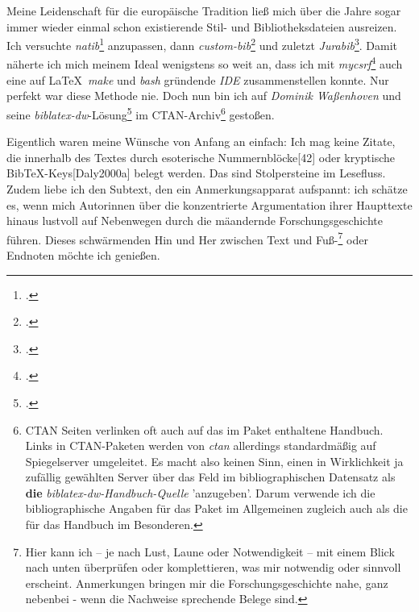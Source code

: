 Meine Leidenschaft für die europäische Tradition ließ mich über die Jahre sogar immer wieder einmal schon existierende Stil- und Bibliotheksdateien ausreizen. Ich versuchte \emph{natib}\footcite[vgl.][]{Daly2000a} anzupassen, dann \emph{custom-bib}\footcite[vgl.][]{Daly2007a} und zuletzt \emph{Jurabib}\footcite[vgl.][]{Berger2004a}. Damit näherte ich mich meinem Ideal wenigstens so weit an, dass ich mit  \emph{mycsrf}\footcite[vgl.][]{Reincke2021a} auch eine auf \LaTeX\, \emph{make} und \emph{bash} gründende \emph{IDE} zusammenstellen konnte. Nur perfekt war diese Methode nie. Doch nun bin ich auf \emph{Dominik Waßenhoven} und seine \emph{biblatex-dw}-Lösung\footcite[vgl.][]{Waßenhoven2016a} im CTAN-Archiv\footnote{CTAN Seiten verlinken oft auch auf das im Paket enthaltene Handbuch. Links in CTAN-Paketen werden von \emph{ctan} allerdings standardmäßig auf Spiegelserver umgeleitet. Es macht also keinen Sinn, einen in Wirklichkeit ja zufällig gewählten Server über das Feld  im bibliographischen Datensatz als \textbf{die} \emph{biblatex-dw-Handbuch-Quelle} 'anzugeben'. Darum verwende ich die bibliographische Angaben für das Paket im Allgemeinen zugleich auch als die für das Handbuch im Besonderen.} gestoßen.

Eigentlich waren meine Wünsche von Anfang an einfach: Ich mag keine Zitate, die innerhalb des Textes durch esoterische Nummernblöcke[42] oder kryptische Bib\TeX-Keys[Daly2000a] belegt werden. Das sind Stolpersteine im Lesefluss. Zudem liebe ich den Subtext, den ein Anmerkungsapparat aufspannt: ich schätze es, wenn mich Autorinnen über die konzentrierte Argumentation ihrer Haupttexte hinaus lustvoll auf Nebenwegen durch die mäandernde Forschungsgeschichte führen. Dieses schwärmenden Hin und Her zwischen Text und Fuß-\footnote{Hier kann ich -- je nach Lust, Laune oder Notwendigkeit -- mit einem Blick nach unten überprüfen oder komplettieren, was mir notwendig oder sinnvoll erscheint. Anmerkungen bringen mir die Forschungsgeschichte nahe, ganz nebenbei - wenn die Nachweise sprechende Belege sind.} oder Endnoten möchte ich genießen.

